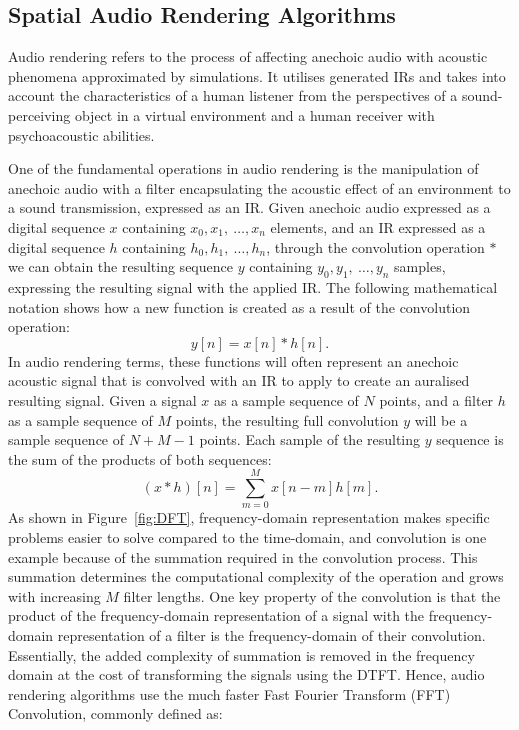 \subsection{Spatial Audio Rendering Algorithms}
\label{sec:real-time-conv}
Audio rendering refers to the process of affecting anechoic audio with acoustic phenomena approximated by simulations. It utilises generated IRs and takes into account the characteristics of a human listener from the perspectives of a sound-perceiving object in a virtual environment and a human receiver with psychoacoustic abilities.

One of the fundamental operations in audio rendering is the manipulation of anechoic audio with a filter encapsulating the acoustic effect of an environment to a sound transmission, expressed as an IR. Given anechoic audio expressed as a digital sequence $x$ containing $x_0, x_1,~\dots,x_n$ elements, and an IR expressed as a digital sequence $h$ containing $h_0, h_1,~\dots,h_n$, through the convolution operation $*$ we can obtain the resulting sequence $y$ containing $y_0, y_1,~\dots, y_n$ samples, expressing the resulting signal with the applied IR. The following mathematical notation shows how a new function is created as a result of the convolution operation:
\begin{equation}
    y[n] = x[n] * h[n].
\label{eq:1d-convolution}
\end{equation}
In audio rendering terms, these functions will often represent an anechoic acoustic signal that is convolved with an IR to apply to create an auralised resulting signal. Given a signal $x$ as a sample sequence of $N$ points, and a filter $h$ as a sample sequence of $M$ points, the resulting full convolution $y$ will be a sample sequence of $N + M - 1$ points. Each sample of the resulting $y$ sequence is the sum of the products of both sequences: 
\begin{equation}
    (x * h)[n] = \sum_{m=0}^{M}x[n-m]h[m].
\end{equation}
As shown in Figure~\ref{fig:DFT}, frequency-domain representation makes specific problems easier to solve compared to the time-domain, and convolution is one example because of the summation required in the convolution process. This summation determines the computational complexity of the operation and grows with increasing $M$ filter lengths. One key property of the convolution is that the product of the frequency-domain representation of a signal with the frequency-domain representation of a filter is the frequency-domain of their convolution. Essentially, the added complexity of summation is removed in the frequency domain at the cost of transforming the signals using the DTFT. Hence, audio rendering algorithms use the much faster Fast Fourier Transform (FFT) Convolution, commonly defined as:
